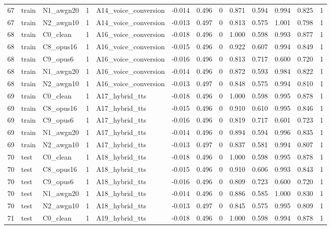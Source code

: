 \begin{tabular}{rllrlrrrrrrrr}
67 & train & N1_awgn20 & 1 & A14_voice_conversion & -0.014 & 0.496 & 0 & 0.871 & 0.594 & 0.994 & 0.825 & 1 \\
67 & train & N2_awgn10 & 1 & A14_voice_conversion & -0.013 & 0.497 & 0 & 0.813 & 0.575 & 1.001 & 0.798 & 1 \\
68 & train & C0_clean & 1 & A16_voice_conversion & -0.018 & 0.496 & 0 & 1.000 & 0.598 & 0.993 & 0.877 & 1 \\
68 & train & C8_opus16 & 1 & A16_voice_conversion & -0.015 & 0.496 & 0 & 0.922 & 0.607 & 0.994 & 0.849 & 1 \\
68 & train & C9_opus6 & 1 & A16_voice_conversion & -0.016 & 0.496 & 0 & 0.813 & 0.717 & 0.600 & 0.720 & 1 \\
68 & train & N1_awgn20 & 1 & A16_voice_conversion & -0.014 & 0.496 & 0 & 0.872 & 0.593 & 0.984 & 0.822 & 1 \\
68 & train & N2_awgn10 & 1 & A16_voice_conversion & -0.013 & 0.497 & 0 & 0.848 & 0.575 & 0.994 & 0.810 & 1 \\
69 & train & C0_clean & 1 & A17_hybrid_tts & -0.018 & 0.496 & 0 & 1.000 & 0.598 & 0.995 & 0.878 & 1 \\
69 & train & C8_opus16 & 1 & A17_hybrid_tts & -0.015 & 0.496 & 0 & 0.910 & 0.610 & 0.995 & 0.846 & 1 \\
69 & train & C9_opus6 & 1 & A17_hybrid_tts & -0.016 & 0.496 & 0 & 0.819 & 0.717 & 0.601 & 0.723 & 1 \\
69 & train & N1_awgn20 & 1 & A17_hybrid_tts & -0.014 & 0.496 & 0 & 0.894 & 0.594 & 0.996 & 0.835 & 1 \\
69 & train & N2_awgn10 & 1 & A17_hybrid_tts & -0.013 & 0.497 & 0 & 0.837 & 0.581 & 0.994 & 0.807 & 1 \\
70 & test & C0_clean & 1 & A18_hybrid_tts & -0.018 & 0.496 & 0 & 1.000 & 0.598 & 0.995 & 0.878 & 1 \\
70 & test & C8_opus16 & 1 & A18_hybrid_tts & -0.015 & 0.496 & 0 & 0.910 & 0.606 & 0.993 & 0.843 & 1 \\
70 & test & C9_opus6 & 1 & A18_hybrid_tts & -0.016 & 0.496 & 0 & 0.809 & 0.723 & 0.600 & 0.720 & 1 \\
70 & test & N1_awgn20 & 1 & A18_hybrid_tts & -0.014 & 0.496 & 0 & 0.886 & 0.585 & 1.000 & 0.830 & 1 \\
70 & test & N2_awgn10 & 1 & A18_hybrid_tts & -0.013 & 0.497 & 0 & 0.845 & 0.575 & 0.995 & 0.809 & 1 \\
71 & test & C0_clean & 1 & A19_hybrid_tts & -0.018 & 0.496 & 0 & 1.000 & 0.598 & 0.994 & 0.878 & 1 \\

\end{tabular}
